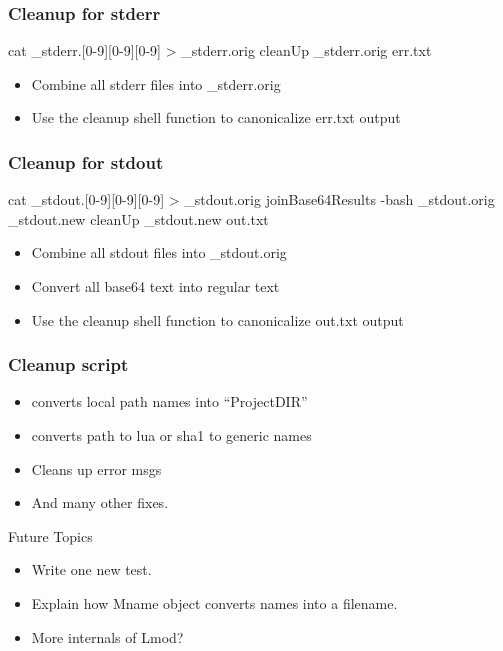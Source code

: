 \documentclass{beamer}
\begin{document}
\begin{frame}[fragile]
  \frametitle{Cleanup for stderr}
    {\tiny
\begin{semiverbatim}
     cat \_stderr.[0-9][0-9][0-9] > \_stderr.orig
     cleanUp \_stderr.orig err.txt
\end{semiverbatim}
    }
    \begin{itemize}
      \item Combine all stderr files into \_stderr.orig
      \item Use the cleanup shell function to canonicalize err.txt output
    \end{itemize}
\end{frame}

\begin{frame}[fragile]
  \frametitle{Cleanup for stdout}
    {\tiny
\begin{semiverbatim}
     cat \_stdout.[0-9][0-9][0-9] > \_stdout.orig
     joinBase64Results  -bash  \_stdout.orig \_stdout.new
     cleanUp \_stdout.new out.txt
\end{semiverbatim}
    }
    \begin{itemize}
      \item Combine all stdout files into \_stdout.orig
      \item Convert all base64 text into regular text
      \item Use the cleanup shell function to canonicalize out.txt output
    \end{itemize}
\end{frame}

\begin{frame}[fragile]
  \frametitle{Cleanup script}
    {\small
\begin{semiverbatim}
\end{semiverbatim}
    }
    \begin{itemize}
      \item converts local path names into ``ProjectDIR''
      \item converts path to lua or sha1 to generic names
      \item Cleans up error msgs 
      \item And many other fixes.
    \end{itemize}
\end{frame}



\begin{frame}{Future Topics}
  \begin{itemize}
    \item Write one new test.
    \item Explain how Mname object converts names into a filename.
    \item More internals of Lmod?
  \end{itemize}
\end{frame}
\end{document}
